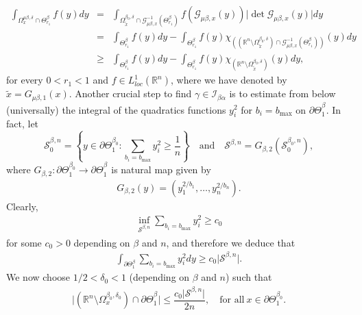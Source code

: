 \documentclass[10pt, leqno]{article}
\theoremstyle{definition}
\theoremstyle{remark}
\numberwithin{equation}{section}
\begin{document}
\begin{eqnarray}
\label{integral on anisotropic cones via integral on classcal cones}
\int_{\Omega^{\mu \beta, \delta_{}}_{x}\cap \Theta^{\beta}_{r_{1}}} f(y) dy & = & \int_{\Omega^{\beta_{0}, \delta_{}}_{\tilde{x}}\cap \mathcal{G}^{-1}_{\mu \beta,x}(\Theta^{\beta}_{r_{1}})} f(\mathcal{G}^{}_{\mu \beta,x}(y))\vert \det \mathcal{G}^{}_{\mu \beta, x}(y) \vert dy \\ \nonumber
& = & \int_{\Theta^{\beta}_{r_{1}}} f(y) dy - \int_{\Theta^{\beta}_{r_{1}}} f(y)\chi_{\left((\mathbb{R}^{n} \setminus \Omega^{\beta_{0}, \delta_{}}_{\tilde{x}}) \cap \mathcal{G}^{-1}_{\mu \beta,x}(\Theta^{\beta}_{r_{1}})\right)}(y) dy \\ \nonumber
& \geq & \int_{\Theta^{\beta}_{r_{1}}} f(y) dy - \int_{\Theta^{\beta}_{r_{1}}} f(y)\chi_{ \left( \mathbb{R}^{n} \setminus \Omega^{\beta_{0}, \delta_{}}_{\tilde{x}}\right)}(y) dy,
\end{eqnarray}
for every $0 < r_{1} < 1$ and $f \in L^{1}_{loc}\left( \mathbb{R}^{n} \right)$, where we have denoted by $\tilde{x} = G_{\mu\beta, 1}(x)$.
Another crucial step to find $\gamma \in \mathcal{I}_{\beta\alpha}$ is to estimate from below (universally) the integral of the quadratics functions $y^{2}_{i}$ for $b_{i}=b_{\max}$ on $\partial\Theta^{\beta_{}}_{1}$. In fact, let
$$
\mathcal{S}_{0}^{\beta_{},n} = \left\lbrace y \in \partial\Theta^{\beta_{0}}_{1}: \sum_{b_{i}= b_{\max}}^{} y^{2}_{i} \geq \frac{1}{n} \right\rbrace \quad \text{and} \quad \mathcal{S}^{\beta,n}_{} = G_{\beta,2}^{}(\mathcal{S}^{\beta_{0},n}_{0}),
$$
where $G_{\beta,2}: \partial\Theta^{\beta_{0}}_{1} \rightarrow \partial\Theta^{\beta_{}}_{1}$ is natural map given by
\begin{eqnarray*}
G_{\beta,2}(y)= \left(y_{1}^{2/b_{1}}, \dots, y_{n}^{2/b_{n}} \right).
\end{eqnarray*}
Clearly,
\begin{eqnarray*}
\inf_{\mathcal{S}^{\beta,n}_{}} \sum_{b_{i}= b_{\max}}^{} y^{2}_{i} \geq c_{0}
\end{eqnarray*}
for some $c_{0}>0$ depending on $\beta$ and $n$, and therefore we deduce that
\begin{eqnarray}
\label{bound from below on S_beta_delta_zero}
\int_{\partial\Theta^{\beta}_{1}} \sum_{b_{i}= b_{\max}}^{} y^{2}_{i} dy \geq c_{0}\vert \mathcal{S}^{\beta,n} \vert.
\end{eqnarray}
We now choose $1/2 < \delta_{0} < 1$ (depending on $\beta$ and $n$) such that
\begin{eqnarray}
\label{geometric asymptotic condition on alpha}
\vert \left(\mathbb{R}^{n} \setminus \Omega^{\beta_{0},\delta_{0}}_{x} \right) \cap \partial\Theta^{\beta_{}}_{1} \vert \leq \dfrac{c_{0}\vert \mathcal{S}^{\beta,n} \vert }{2n}, \quad \text{for all} \ x \in \partial\Theta^{\beta_{0}}_{1}.
\end{eqnarray}
\end{document}
